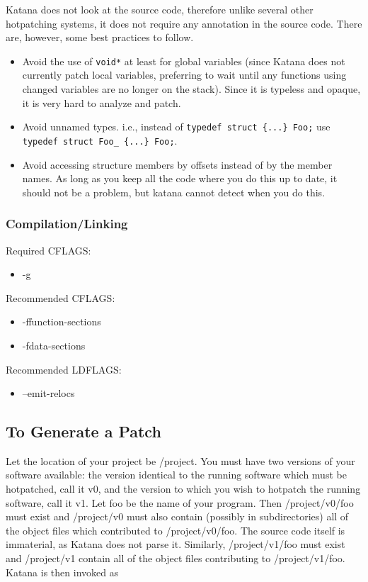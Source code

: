 \documentclass[11pt]{article}
\begin{document}
    Katana does not look at the source code, therefore unlike several
    other hotpatching systems, it does not require any annotation in
    the source code. There are, however, some best practices to
    follow.
\begin{itemize}
\item Avoid the use of \texttt{void*} at least for global variables (since
      Katana does not currently patch local variables, preferring to
      wait until any functions using changed variables are no longer
      on the stack). Since it is typeless and opaque, it is very hard
      to analyze and patch.
\item Avoid unnamed types. i.e., instead of \texttt{typedef struct \{...\} Foo;}
      use \texttt{typedef struct Foo\_ \{...\} Foo;}.
\item Avoid accessing structure members by offsets instead of by the
      member names. As long as you keep all the code where you do this
      up to date, it should not be a problem, but katana cannot detect
      when you do this.
\end{itemize}
\subsubsection{Compilation/Linking}
\label{sec-6.1.2}

    Required CFLAGS:
\begin{itemize}
\item -g
\end{itemize}
    Recommended CFLAGS:
\begin{itemize}
\item -ffunction-sections
\item -fdata-sections
\end{itemize}
    Recommended LDFLAGS:
\begin{itemize}
\item --emit-relocs
\end{itemize}
\subsection{To Generate a Patch}
\label{sec-6.2}

   Let the location of your project be /project. You must have two
   versions of your software available: the version identical to the
   running software which must be hotpatched, call it v0, and the
   version to which you wish to hotpatch the running software, call it
   v1. Let foo be the name of your program. Then /project/v0/foo must
   exist and /project/v0 must also contain (possibly in
   subdirectories) all of the object files which contributed to
   /project/v0/foo. The source code itself is immaterial, as Katana
   does not parse it. Similarly, /project/v1/foo must exist and
   /project/v1 contain all of the object files contributing to
   /project/v1/foo. Katana is then invoked as
\end{document}
